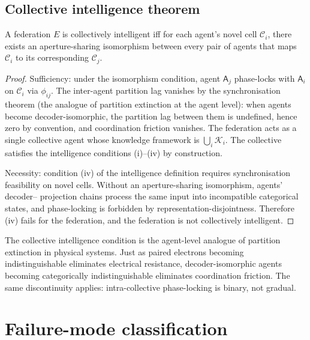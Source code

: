\documentclass[11pt,twocolumn,a4paper]{article}
\newcommand{\K}{\mathcal{K}}
\newcommand{\Cell}{\mathcal{C}}
\newcommand{\agent}{\mathsf{A}}
\begin{document}
\subsection{Collective intelligence theorem}

\begin{theorem}\label{thm:t5}
A federation $E$ is collectively intelligent iff for each agent's novel cell $\Cell_i$,
there exists an aperture-sharing isomorphism between every pair of agents that maps
$\Cell_i$ to its corresponding $\Cell_j$.
\end{theorem}

\begin{proof}
Sufficiency: under the isomorphism condition, agent $\agent_j$ phase-locks with
$\agent_i$ on $\Cell_i$ via $\phi_{ij}$. The inter-agent partition lag vanishes by the
synchronisation theorem (the analogue of partition extinction at the agent level): when
agents become decoder-isomorphic, the partition lag between them is undefined, hence
zero by convention, and coordination friction vanishes. The federation acts as a single
collective agent whose knowledge framework is $\bigcup_i \K_i$. The collective satisfies
the intelligence conditions (i)--(iv) by construction.

Necessity: condition (iv) of the intelligence definition requires synchronisation
feasibility on novel cells. Without an aperture-sharing isomorphism, agents' decoder--
projection chains process the same input into incompatible categorical states, and
phase-locking is forbidden by representation-disjointness. Therefore (iv) fails for the
federation, and the federation is not collectively intelligent.
\end{proof}

\begin{remark}
The collective intelligence condition is the agent-level analogue of partition extinction
in physical systems. Just as paired electrons becoming indistinguishable eliminates
electrical resistance, decoder-isomorphic agents becoming categorically indistinguishable
eliminates coordination friction. The same discontinuity applies: intra-collective
phase-locking is binary, not gradual.
\end{remark}

\section{Failure-mode classification}
\label{sec:phenotypes}
\end{document}

